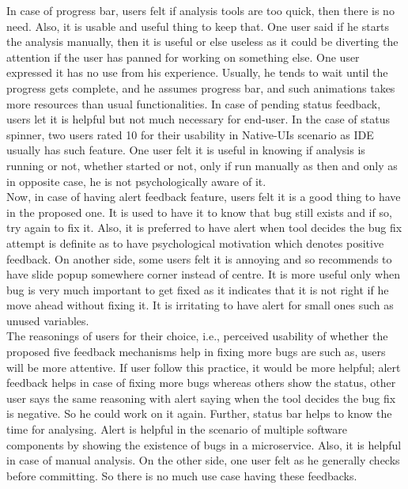 In case of progress bar, users felt if analysis tools are too quick, then there is no need. Also, it is usable and useful thing to keep that. One user said if he starts the analysis manually, then it is useful or else useless as it could be diverting the attention if the user has panned for working on something else. One user expressed it has no use from his experience. Usually, he tends to wait until the progress gets complete, and he assumes progress bar, and such animations takes more resources than usual functionalities. In case of pending status feedback, users let it is helpful but not much necessary for end-user. In the case of status spinner, two users rated 10 for their usability in Native-UIs scenario as IDE usually has such feature. One user felt it is useful in knowing if analysis is running or not, whether started or not, only if run manually as then and only as in opposite case, he is not psychologically aware of it. \\

Now, in case of having alert feedback feature, users felt it is a good thing to have in the proposed one. It is used to have it to know that bug still exists and if so, try again to fix it. Also, it is preferred to have alert when tool decides the bug fix attempt is definite as to have psychological motivation which denotes positive feedback. On another side, some users felt it is annoying and so recommends to have slide popup somewhere corner instead of centre. It is more useful only when bug is very much important to get fixed as it indicates that it is not right if he move ahead without fixing it. It is irritating to have alert for small ones such as unused variables. \\
 
The reasonings of users for their choice, i.e., perceived usability of whether the proposed five feedback mechanisms help in fixing more bugs are such as, users will be more attentive. If user follow this practice, it would be more helpful; alert feedback helps in case of fixing more bugs whereas others show the status, other user says the same reasoning with alert saying when the tool decides the bug fix is negative. So he could work on it again. Further, status bar helps to know the time for analysing. Alert is helpful in the scenario of multiple software components by showing the existence of bugs in a microservice. Also, it is helpful in case of manual analysis. On the other side, one user felt as he generally checks before committing. So there is no much use case having these feedbacks.  \\

